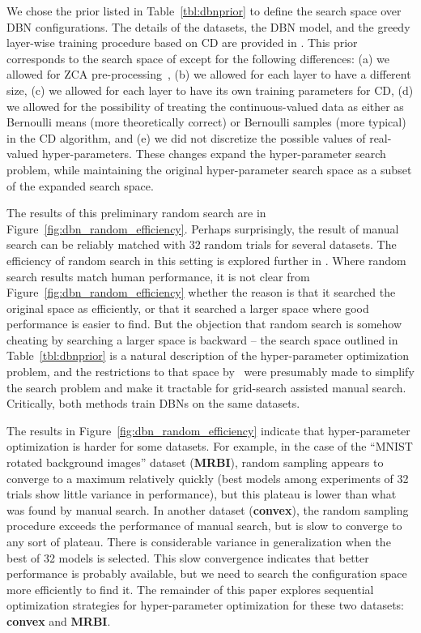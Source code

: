 \documentclass{article}
\renewcommand{\citet}{\cite}
\begin{document}
We chose the prior listed in Table~\ref{tbl:dbnprior} to define the search
space over DBN configurations.
The details of the datasets, the DBN model, and the greedy layer-wise training procedure based on CD
are provided in \cite{Larochelle+etal:2007}.
This prior corresponds to the search space of \cite{Larochelle+etal:2007}
except for the following differences:
(a) we allowed for ZCA pre-processing~\citep{hyvarinen+oja:2000},
(b) we allowed for each layer to have a different size,
(c) we allowed for each layer to have its own training parameters for CD,
(d) we allowed for the possibility of treating the continuous-valued data
as either as Bernoulli means (more theoretically correct)
or Bernoulli samples (more typical) in the CD algorithm, and
(e) we did not discretize the possible values of real-valued hyper-parameters.
These changes expand the hyper-parameter search problem,
while maintaining the original hyper-parameter search space as a subset of the expanded search space.

The results of this preliminary random search are in Figure~\ref{fig:dbn_random_efficiency}.
Perhaps surprisingly, the result of manual search can be reliably matched with 32 random trials for several datasets.
The efficiency of random search in this setting is explored further in
\citet{bergstra+bengio:2012accepted}.
Where random search results match human performance,
it is not clear from Figure~\ref{fig:dbn_random_efficiency}
whether the reason is that it searched the original space as efficiently,
or that it searched a larger space where good performance is easier to find.
But the objection that random search is somehow cheating by searching a larger space is backward --
the search space outlined in Table~\ref{tbl:dbnprior} is a natural description
of the hyper-parameter optimization problem, and the restrictions to that
space by~\citet{Larochelle+etal:2007} were presumably made to simplify
the search problem and make it tractable for grid-search assisted manual search.
Critically, both methods train DBNs on the same datasets.

The results in Figure~\ref{fig:dbn_random_efficiency} indicate that
hyper-parameter optimization is harder for some datasets.
For example, in the case of the ``MNIST rotated background images'' dataset ({\bf MRBI}),
random sampling appears to converge to a maximum relatively quickly (best
models among experiments of 32 trials show little variance in performance),
but this plateau is lower than what was found by manual search.
In another dataset ({\bf convex}), the random sampling procedure exceeds the performance of manual search, but is slow to converge to any sort of plateau.
There is considerable variance in generalization when the best of 32 models is selected.
This slow convergence indicates that better performance is probably available, but we need to search the configuration space more efficiently to find it.
The remainder of this paper explores sequential optimization strategies for hyper-parameter optimization for these two datasets: {\bf convex} and {\bf MRBI}.
\end{document}
